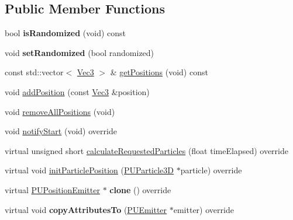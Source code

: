 \subsection*{Public Member Functions}
\begin{DoxyCompactItemize}
\item 
\mbox{\label{classPUPositionEmitter_a765aa50e39c3dc15827ced51c5d78763}} 
bool {\bfseries is\+Randomized} (void) const
\item 
\mbox{\label{classPUPositionEmitter_a6d7e2c7c78873a17970e5818db741a36}} 
void {\bfseries set\+Randomized} (bool randomized)
\item 
const std\+::vector$<$ \hyperlink{classVec3}{Vec3} $>$ \& \hyperlink{classPUPositionEmitter_a4e074c80e58b78f596e30d6018c6bcf7}{get\+Positions} (void) const
\item 
void \hyperlink{classPUPositionEmitter_a903a6a3c8124f015c880ffe22a89e0e7}{add\+Position} (const \hyperlink{classVec3}{Vec3} \&position)
\item 
void \hyperlink{classPUPositionEmitter_a72b416af36fd90660a8d1778b559fefd}{remove\+All\+Positions} (void)
\item 
void \hyperlink{classPUPositionEmitter_ae71cdf6eae8f3dc4d66baace5d9785ba}{notify\+Start} (void) override
\item 
virtual unsigned short \hyperlink{classPUPositionEmitter_a1817d8fb364e86fa04805c35a9c07961}{calculate\+Requested\+Particles} (float time\+Elapsed) override
\item 
virtual void \hyperlink{classPUPositionEmitter_ab23517a23c156545d99238298b3ac0c6}{init\+Particle\+Position} (\hyperlink{structPUParticle3D}{P\+U\+Particle3D} $\ast$particle) override
\item 
\mbox{\label{classPUPositionEmitter_aadb3fd751f21be865cd76e07f1f5b213}} 
virtual \hyperlink{classPUPositionEmitter}{P\+U\+Position\+Emitter} $\ast$ {\bfseries clone} () override
\item 
\mbox{\label{classPUPositionEmitter_aeb4524607bb00b08b7548e0c14525833}} 
virtual void {\bfseries copy\+Attributes\+To} (\hyperlink{classPUEmitter}{P\+U\+Emitter} $\ast$emitter) override
\item 
\mbox{\label{classPUPositionEmitter_a765aa50e39c3dc15827ced51c5d78763}} 

\end{DoxyCompactItemize}
